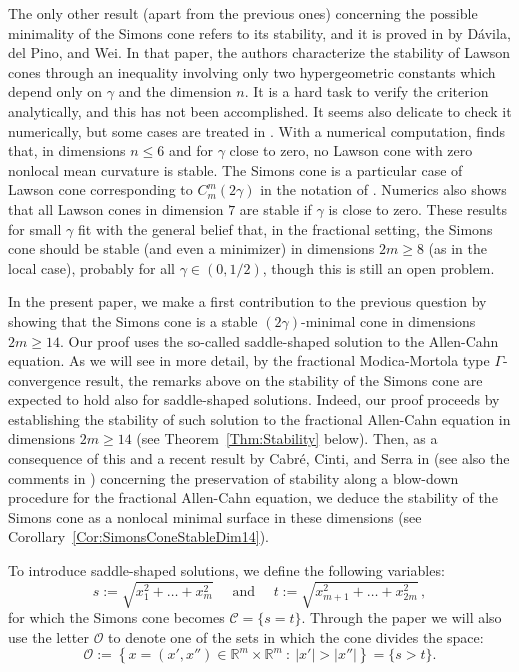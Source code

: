 \documentclass[twoside,leqno,symbols-for-thanks, draft]{rmi}
\numberwithin{equation}{section}
\theoremstyle{definition}
\newcommand{\con}[1]{\mathbb{#1}}
\newcommand{\R}{\con{R}} %
\newcommand{\ocal}{\mathcal{O}}
\newcommand{\s}{\gamma}
\newcommand{\setcond}[2]{\left \{ #1 \ : \ #2  \right \}}
\begin{document}
The only other result (apart from the previous ones) concerning the possible minimality of the Simons cone refers to its stability, and it is proved in \cite{DaviladelPinoWei} by D\'avila, del Pino, and Wei.  In that paper, the authors characterize the stability of Lawson cones through an inequality involving only two hypergeometric constants which depend only on $\s$ and the dimension $n$. It is a hard task to verify the criterion analytically, and this has not been accomplished. It seems also delicate to check it numerically, but some cases are treated in \cite{DaviladelPinoWei}. With a numerical computation, \cite{DaviladelPinoWei} finds that, in dimensions $n \leq 6$ and for $\s $ close to zero, no Lawson cone with zero nonlocal mean curvature is stable. The Simons cone is a particular case of Lawson cone corresponding to $C_m^m(2\s)$ in the notation of \cite{DaviladelPinoWei}. Numerics also shows that all Lawson cones in dimension $7$ are stable if $\s$ is close to zero. These results for small $\s$ fit with the general belief that, in the fractional setting, the Simons cone should be stable (and even a minimizer) in dimensions $2m \geq 8$ (as in the local case), probably for all $\s\in(0,1/2)$, though this is still an open problem. 

In the present paper, we make a first contribution to the previous question by showing that the Simons cone is a stable $(2\s)$-minimal cone in dimensions $2m\geq 14$. Our proof uses the so-called saddle-shaped solution to the Allen-Cahn equation. As we will see in more detail, by the fractional Modica-Mortola type $\Gamma$-convergence result, the remarks above on the stability of the Simons cone are expected to hold also for saddle-shaped solutions. Indeed, our proof proceeds by establishing the stability of such solution to the fractional Allen-Cahn equation in dimensions $2m \geq 14$ (see Theorem~\ref{Thm:Stability} below). Then, as a consequence of this and a recent result by Cabr\'e, Cinti, and Serra in \cite{CabreCintiSerra-Stable} (see also the comments in \cite{CabreCintiSerra-Cones}) concerning the preservation of stability along a blow-down procedure for the fractional Allen-Cahn equation, we deduce the stability of the Simons cone as a nonlocal minimal surface in these dimensions (see Corollary~\ref{Cor:SimonsConeStableDim14}). 

To introduce saddle-shaped solutions, we define the following variables:
$$
s := \sqrt{x_1^2 + \ldots + x_m^2 } \quad \text{ and } \quad 
t := \sqrt{x_{m+1}^2 + \ldots + x_{2m}^2}\,,
$$
for which the Simons cone becomes $\mathscr{C} = \{s=t\}$. Through the paper we will also use the letter $\ocal$ to denote one of the sets in which the cone divides the space:
$$
\ocal:= \setcond{x = (x', x'') \in \R^{m}\times \R^m}{|x'| > |x''|} = \{s > t\}.
$$
\end{document}
